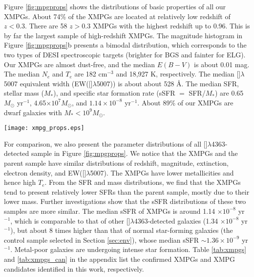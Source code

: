 \documentclass[twocolumn]{aastex631}
\newcommand{\OIII}{[\mbox{\ion{O}{3}}]}   %
\newcommand{\OIIIFIZ}{[\mbox{\ion{O}{3}}]$\lambda$5007}
\newcommand{\OIIIFOT}{[\mbox{\ion{O}{3}}]$\lambda$4363}
\newcommand{\Msun}{\mbox{$M_{\odot}$}}
\begin{document}
Figure \ref{fig:mpgprops} shows the distributions of basic properties of all our XMPGs. About 74\% of the XMPGs are located at relatively low redshift of $z < 0.3$.  There are 58 $z>0.3$ XMPGs with the highest redshift up to 0.96.  This is by far the largest sample of high-redshift XMPGs. The magnitude histogram in Figure \ref{fig:mpgprops}b presents a bimodal distribution, which corresponds to the two types of DESI spectroscopic targets (brighter for BGS and fainter for ELG). Our XMPGs are almost dust-free, and the median $E(B-V)$ is about 0.01 mag. The median $N_e$ and $T_e$ are 182 cm$^{-3}$ and 18,927 K, respectively. The median {\OIIIFIZ} equivalent width (EW(\OIIIFIZ)) is about about 528 \AA. The median SFR, stellar mass ($M_*$), and specific star formation rate (sSFR $=$ SFR/$M_*$) are 0.65 {\Msun} yr$^{-1}$, 4.65$\times10^7 \Msun$, and $1.14\times10^{-8}$ yr$^{-1}$. About 89\% of our XMPGs are dwarf galaxies with $M_* < 10^9 \Msun$. 
\begin{figure*}[tbh!]
\centering
\texttt{[image: xmpg\_props.eps]}
\caption{Distributions of basic properties for all our XMPGs (blue) and \OIIIFOT-detected galaxies (red), including redshift (a), $r$-band magnitude in mag (b), gas-phase extinction $E(B-V)$ in mag (c), electron density $N_e$ (d) in cm$^{-3}$, electron temperature $T_e$ in K (e), logarithmic equivalent width of \OIII$\lambda$5007 in {\AA} (f),  logarithmic SFR in \Msun yr$^{-1}$ (g), logarithmic stellar mass in {\Msun} (h), and logarithmic sSFR in yr$^{-1}$ (i). \label{fig:mpgprops}}
\end{figure*}

For comparison, we also present the parameter distributions of all \OIIIFOT-detected sample in Figure \ref{fig:mpgprops}. We notice that the XMPGs and the parent sample have similar distributions of redshift, magnitude, extinction, electron density, and EW(\OIIIFIZ). The XMPGs have lower metallicities and hence high $T_e$. From the SFR and mass distributions, we find that the XMPGs tend to present relatively lower SFRs than the parent sample, mostly due to their lower mass. Further investigations show that the sSFR distributions of these two samples are more similar. The median sSFR of XMPGs is around 1.14 $\times 10^{-8}$ yr$^{-1}$, which is comparable to that of other \OIIIFOT-detected galaxies (1.34 $\times 10^{-8}$ yr$^{-1}$), but about 8 times higher than that of normal star-forming galaxies (the control sample selected in Section \ref{sec:env}), whose median sSFR $\sim 1.36 \times 10^{-9}$ yr$^{-1}$. Metal-poor galaxies are undergoing intense star formation. Table \ref{tab:xmpgs} and \ref{tab:xmpgs_can} in the appendix list the confirmed XMPGs and XMPG candidates identified in this work, respectively.
\end{document}
